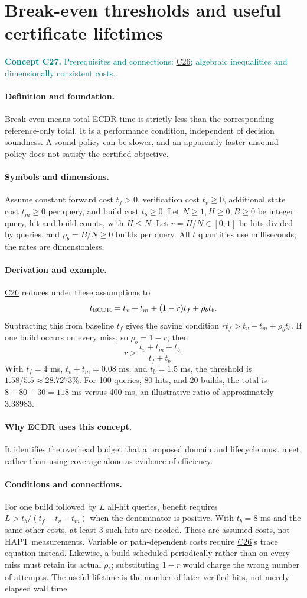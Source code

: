 \documentclass[11pt,a4paper]{article}
\newcommand{\conceptid}{Front matter}
\newcommand{\concept}[3]{\clearpage\renewcommand{\conceptid}{#1}%
\section{#2}\label{concept:#1}%
\textcolor{teal}{\textbf{Concept #1.} Prerequisites and connections: #3.}\par
\typeout{ECDR-CONCEPT-START #1 PAGE=\thepage}}
\begin{document}
\concept{C27}{Break-even thresholds and useful certificate lifetimes}{\hyperref[concept:C26]{C26}; algebraic inequalities and dimensionally consistent costs.}
\paragraph{Definition and foundation.}
Break-even means total ECDR time is strictly less than the corresponding reference-only total. It is a performance condition, independent of decision soundness. A sound policy can be slower, and an apparently faster unsound policy does not satisfy the certified objective.
\paragraph{Symbols and dimensions.}
Assume constant forward cost $t_f>0$, verification cost $t_v\ge0$, additional state cost $t_m\ge0$ per query, and build cost $t_b\ge0$. Let $N\ge1,H\ge0,B\ge0$ be integer query, hit and build counts, with $H\le N$. Let $r=H/N\in[0,1]$ be hits divided by queries, and $\rho_b=B/N\ge0$ builds per query. All $t$ quantities use milliseconds; the rates are dimensionless.
\paragraph{Derivation and example.}
\hyperref[concept:C26]{C26} reduces under these assumptions to
\[
 \bar t_{\rm ECDR}=t_v+t_m+(1-r)t_f+\rho_b t_b.
\]
Subtracting this from baseline $t_f$ gives the saving condition $rt_f>t_v+t_m+\rho_b t_b$. If one build occurs on every miss, so $\rho_b=1-r$, then
\[
 r>\frac{t_v+t_m+t_b}{t_f+t_b}.
\]
With $t_f=4$ ms, $t_v+t_m=0.08$ ms, and $t_b=1.5$ ms, the threshold is $1.58/5.5\approx28.7273\%$. For 100 queries, 80 hits, and 20 builds, the total is $8+80+30=118$ ms versus 400 ms, an illustrative ratio of approximately 3.38983.
\paragraph{Why ECDR uses this concept.}
It identifies the overhead budget that a proposed domain and lifecycle must meet, rather than using coverage alone as evidence of efficiency.
\paragraph{Conditions and connections.}
For one build followed by $L$ all-hit queries, benefit requires $L>t_b/(t_f-t_v-t_m)$ when the denominator is positive. With $t_b=8$ ms and the same other costs, at least 3 such hits are needed. These are assumed costs, not HAPT measurements. Variable or path-dependent costs require \hyperref[concept:C26]{C26}'s trace equation instead. Likewise, a build scheduled periodically rather than on every miss must retain its actual $\rho_b$; substituting $1-r$ would charge the wrong number of attempts. The useful lifetime is the number of later verified hits, not merely elapsed wall time.
\par\label{endconcept:C27}
\end{document}
